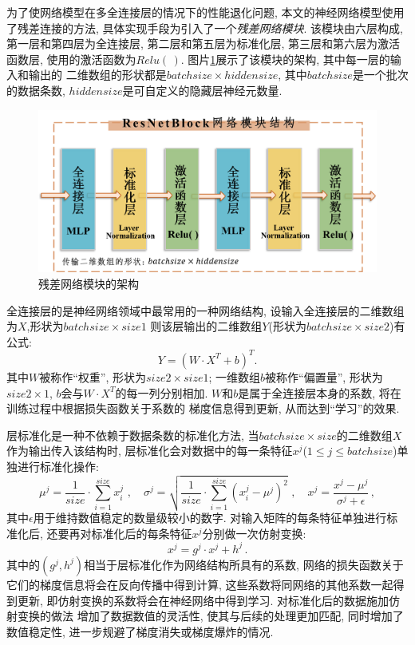\documentclass[a4paper,punct=banjiao,twoside]{ctexrep}
\theoremstyle{plain}
\theoremstyle{definition}
\theoremstyle{remark}
\begin{document}
为了使网络模型在多全连接层的情况下的性能退化问题, 本文的神经网络模型使用了残差连接的方法, 具体实现手段为引入了一个\textit{残差网络模块}.
该模块由六层构成, 第一层和第四层为全连接层, 第二层和第五层为标准化层, 第三层和第六层为激活函数层, 使用的激活函数为$Relu(\,)$. 图片\ref{残差网络模块}展示了该模块的架构, 其中每一层的输入和输出的
二维数组的形状都是$batchsize \times hiddensize$, 其中$batchsize$是一个批次的数据条数, $hiddensize$是可自定义的隐藏层神经元数量. 
\begin{figure}[H]
  \centering
  \includegraphics[scale=0.45]{./figs/p5_1.png}
  \caption{残差网络模块的架构}
  \label{残差网络模块}
\end{figure}
全连接层的是神经网络领域中最常用的一种网络结构, 设输入全连接层的二维数组为$X$,形状为$batchsize\times size1$ 则该层输出的二维数组$Y$(形状为$batchsize\times size2$)有公式:
$$
Y = (W\cdot X^{T} + b)^{T}.
$$
其中$W$被称作``权重'', 形状为$size2\times size1$; 一维数组$b$被称作``偏置量'', 形状为$size2\times 1$, $b$会与$W\cdot X^{T}$的每一列分别相加. $W$和$b$是属于全连接层本身的系数, 将在训练过程中根据损失函数关于系数的
梯度信息得到更新, 从而达到``学习''的效果.

层标准化是一种不依赖于数据条数的标准化方法, 当$batchsize\times size$的二维数组$X$作为输出传入该结构时, 层标准化会对数据中的每一条特征$x^j$($1\leq j \leq batchsize$)单独进行标准化操作:
$$
\mu^j = \frac{1}{size}\cdot \sum_{i = 1}^{size}  x_i^j \,\,, \quad  \sigma^j = \sqrt{\frac{1}{size}\cdot \sum_{i = 1}^{size}(x_i^j-\mu^j)^2  } \,\,, \quad x^j = \frac{x^j - \mu^j}{\sigma^j + \epsilon} \,,
$$
\noindent 其中$\epsilon$用于维持数值稳定的数量级较小的数字. 对输入矩阵的每条特征单独进行标准化后, 还要再对标准化后的每条特征$x^j$分别做一次仿射变换:
$$
x^j = g^j \cdot x^j + h^j  \,.
$$
\noindent 其中的$(g^j, h^j)$相当于层标准化作为网络结构所具有的系数, 网络的损失函数关于它们的梯度信息将会在反向传播中得到计算, 这些系数将同网络的其他系数一起得到更新, 即仿射变换的系数将会在神经网络中得到学习. 对标准化后的数据施加仿射变换的做法
增加了数据数值的灵活性, 使其与后续的处理更加匹配, 同时增加了数值稳定性, 进一步规避了梯度消失或梯度爆炸的情况.
\end{document}
